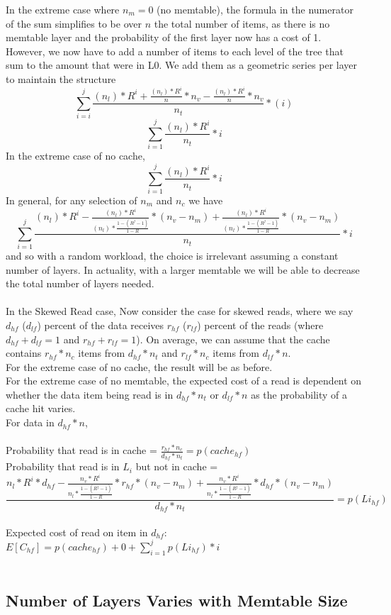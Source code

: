 \documentclass[11pt]{article}
\theoremstyle{plain}
\theoremstyle{definition}
\begin{document}
In the extreme case where $n_m=0$ (no memtable), the formula in the numerator of the sum simplifies to be over $n$ the total number of items, as there is no memtable layer and the probability of the first layer now has a cost of 1. However, we now have to add a number of items to each level of the tree that sum to the amount that were in L0. We add them as a geometric series per layer to maintain the structure
$$
\sum_{i=i}^{j} \frac{(n_l) * R^{i} + \frac{(n_l) * R^{i}}{n} * n_v - \frac{(n_l) * R^{i}}{n} * n_v}{n_t} * (i)
$$
$$
\sum_{i=1}^j \frac{(n_l) * R^i}{n_t} * i 
$$
In the extreme case of no cache, 
$$
\sum_{i=1}^j \frac{(n_l) * R^i}{n_t} * i 
$$
In general, for any selection of $n_m$ and $n_c$ we have
$$
\sum_{i=1}^j \frac{(n_l) * R^i - \frac{(n_l) * R^i}{(n_l) * \frac{1-(R^j-1)}{1-R}} * (n_v-n_m) + \frac{(n_l) * R^i}{(n_l) * \frac{1-(R^j-1)}{1-R}} * (n_v-n_m)}{n_t} * i 
$$
and so with a random workload, the choice is irrelevant assuming a constant number of layers. In actuality, with a larger memtable we will be able to decrease the total number of layers needed. \\
\\
In the Skewed Read case,
Now consider the case for skewed reads, where we say $d_{hf}$ ($d_{lf}$) percent of the data receives $r_{hf}$ ($r_{lf}$) percent of the reads (where $d_{hf} + d_{lf} = 1$ and $r_{hf} + r_{lf} = 1$). On average, we can assume that the cache contains $r_{hf} * n_c$ items from $d_{hf} * n_t$ and $r_{lf} * n_c$ items from $d_{lf} * n$. \\
For the extreme case of no cache, the result will be as before. \\
For the extreme case of no memtable, the expected cost of a read is dependent on whether the data item being read is in $d_{hf} * n_t$ or $d_{lf} * n$ as the probability of a cache hit varies.\\
For data in $d_{hf} * n$, \\ \\
Probability that read is in cache = $\frac{r_{hf} * n_c}{d_{hf} * n_t} = p(cache_{hf})$ \\
Probability that read is in $L_i$ but not in cache = 
$$ 
\frac{n_l * R^{i}*d_{hf} - \frac{n_v * R^{i}}{n_l * \frac{1-(R^j-1)}{1-R}} * r_{hf} * (n_v - n_m)+ \frac{n_v * R^{i}}{n_l * \frac{1-(R^j-1)}{1-R}} *d_{hf} *(n_v - n_m)}{d_{hf} * n_t}  = p(Li_{hf})
$$ \\
Expected cost of read on item in $d_{hf}$: $E[C_{hf}]= p(cache_{hf}) + 0 + \sum_{i=1}^j p(Li_{hf}) * i$\\ \\
\subsection{Number of Layers Varies with Memtable Size}
\end{document}
